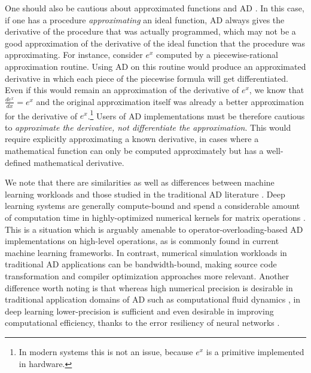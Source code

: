 \documentclass[twoside,11pt]{article}
\begin{document}
One should also be cautious about approximated functions and AD \citep{sirkes-tziperman-1997a}. In this case, if one has a procedure \emph{approximating} an ideal function, AD always gives the derivative of the procedure that was actually programmed, which may not be a good approximation of the derivative of the ideal function that the procedure was approximating. For instance, consider $e^x$ computed by a piecewise-rational approximation routine. Using AD on this routine would produce an approximated derivative in which each piece of the piecewise formula will get differentiated. Even if this would remain an approximation of the derivative of $e^x$, we know that $\frac{de^x}{dx} = e^x$ and the original approximation itself was already a better approximation for the derivative of $e^x$.\footnote{In modern systems this is not an issue, because $e^x$ is a primitive implemented in hardware.} Users of AD implementations must be therefore cautious to \emph{approximate the derivative, not differentiate the approximation}. This would require explicitly approximating a known derivative, in cases where a mathematical function can only be computed approximately but has a well-defined mathematical derivative.

We note that there are similarities as well as differences between machine learning workloads and those studied in the traditional AD literature \citep{baydin2016tricks}. Deep learning systems are generally compute-bound and spend a considerable amount of computation time in highly-optimized numerical kernels for matrix operations \citep{hadjis2015caffe,chetlur2014cudnn}. This is a situation which is arguably amenable to operator-overloading-based AD implementations on high-level operations, as is commonly found in current machine learning frameworks. In contrast, numerical simulation workloads in traditional AD applications can be bandwidth-bound, making source code transformation and compiler optimization approaches more relevant. Another difference worth noting is that whereas high numerical precision is desirable in traditional application domains of AD such as computational fluid dynamics \citep{cohen2009fast}, in deep learning lower-precision is sufficient and even desirable in improving computational efficiency, thanks to the error resiliency of neural networks \citep{gupta2015deep,courbariaux2015binaryconnect}.
\end{document}

